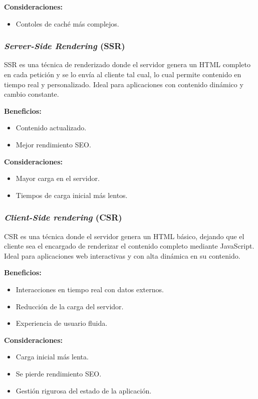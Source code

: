 \textbf{Consideraciones:}
\begin{itemize}
    \item Contoles de caché más complejos.
\end{itemize}

\subsubsection{\textit{Server-Side Rendering} (SSR)}
SSR es una técnica de renderizado donde el servidor genera un HTML completo en cada petición y se lo envía al cliente tal cual, 
lo cual permite contenido en tiempo real y personalizado. Ideal para aplicaciones con contenido dinámico y cambio constante.

\textbf{Beneficios:}
\begin{itemize}
    \item Contenido actualizado.
    \item Mejor rendimiento SEO.
\end{itemize}

\textbf{Consideraciones:}
\begin{itemize}
    \item Mayor carga en el servidor.
    \item Tiempos de carga inicial más lentos.
\end{itemize}

\subsubsection{\textit{Client-Side rendering} (CSR)}
CSR es una técnica donde el servidor genera un HTML básico, dejando que el cliente sea el encargado de renderizar el contenido
completo mediante JavaScript. Ideal para aplicaciones web interactivas y con alta dinámica en su contenido.

\textbf{Beneficios:}
\begin{itemize}
    \item Interacciones en tiempo real con datos externos.
    \item Reducción de la carga del servidor.
    \item Experiencia de usuario fluida.
\end{itemize}

\textbf{Consideraciones:}
\begin{itemize}
    \item Carga inicial más lenta.
    \item Se pierde rendimiento SEO.
    \item Gestión rigurosa del estado de la aplicación.
\end{itemize}

